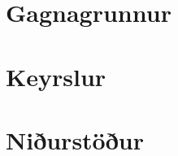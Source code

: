 \documentclass[12pt,a4paper]{article}
\begin{document}
	
	\vspace{2.5cm}
	\newpage


\section{Gagnagrunnur}
	
	 
	\vspace{2cm}

	
	\newpage
\section{Keyrslur}


	
	
\section{Niðurstöður}
	
	
	
\end{document}
